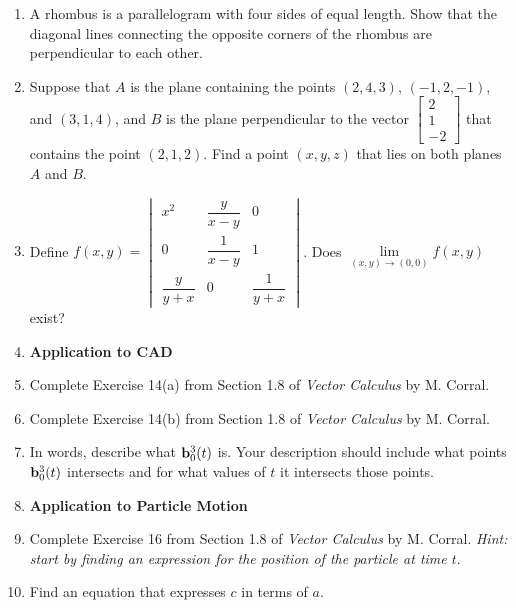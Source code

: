 \documentclass{article}
\begin{document}
\begin{enumerate}
\item 
A rhombus is a parallelogram with four sides of equal length. Show that the diagonal lines connecting the opposite corners of the rhombus are perpendicular to each other.
\item 
Suppose that $A$ is the plane containing the points
$(2, 4, 3)$, $(-1, 2, -1)$, and $(3, 1, 4)$, and $B$ is the plane
perpendicular to the vector \(\begin{bmatrix} 2 \\ 1 \\ -2 
\end{bmatrix}\) that contains the point $(2, 1, 2)$. Find a point $(x, y, z)$ that lies on both planes $A$ and $B$.
\item %
Define \(f(x,y) = \begin{vmatrix}
                   x^2 & \dfrac{y}{x-y} & 0 \\
                   0 & \dfrac{1}{x-y} & 1 \\
                   \dfrac{y}{y+x} & 0 & \dfrac{1}{y+x}
                  \end{vmatrix}
\).  Does $\lim\limits_{(x,y) \to (0,0)}f(x,y)$ exist?
\item %
\textbf{Application to CAD}
\BEN
\item
Complete Exercise 14(a) from Section 1.8 of \textit{Vector Calculus} by M. Corral. 
\item
Complete Exercise 14(b) from Section 1.8 of \textit{Vector Calculus} by M. Corral. 
\item In words, describe what $\mathbf{b}_0^3(t)$ is. Your description should include what points $\mathbf{b}_0^3(t)$ intersects and for what values of $t$ it intersects those points.
\EEN
\item 
\textbf{Application to Particle Motion}
\BEN 
\item Complete Exercise 16 from Section 1.8 of \textit{Vector Calculus} by M. Corral. \textit{Hint: start by finding an expression for the position of the particle at time $t$}.
\item Find an equation that expresses $c$ in terms of $a$. 

\end{enumerate}
\end{document}
